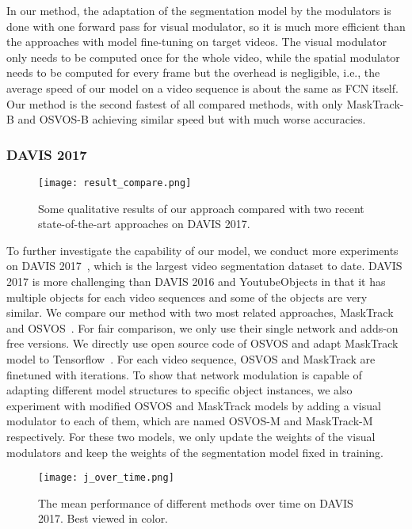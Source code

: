 \documentclass[10pt,twocolumn,letterpaper]{article}
\begin{document}
In our method, the adaptation of the segmentation model by the modulators is done with one forward pass for visual modulator, so it is much more efficient than the approaches with model fine-tuning on target videos. The visual modulator only needs to be computed once for the whole video, while the spatial modulator needs to be computed for every frame but the overhead is negligible, i.e., the average speed of our model on a video sequence is about the same as FCN itself. Our method is the second fastest of all compared methods, with only MaskTrack-B and OSVOS-B achieving similar speed but with much worse accuracies.

\subsubsection{DAVIS 2017}
\begin{figure*}[t]\centering
\texttt{[image: result\_compare.png]}
\caption{Some qualitative results of our approach compared with two recent state-of-the-art approaches on DAVIS 2017.}
\label{fig:compare}\vspace{-2pt}
\end{figure*}

To further investigate the capability of our model, we conduct more experiments on DAVIS 2017~\cite{Pont-Tuset2017davis}, which is the largest video segmentation dataset to date. DAVIS 2017 is more challenging than DAVIS 2016 and YoutubeObjects in that it has multiple objects for each video sequences and some of the objects are very similar. We compare our method with two most related approaches, MaskTrack~\cite{Perazzi2017masktrack} and OSVOS~\cite{Caelles2017osvos}. For fair comparison, we only use their single network and adds-on free versions. We directly use open source code of OSVOS and adapt MaskTrack model to Tensorflow~\cite{tensorflow2015}. For each video sequence, OSVOS and MaskTrack are finetuned with  iterations. To show that network modulation is capable of adapting different model structures to specific object instances, we also experiment with modified OSVOS and MaskTrack models by adding a visual modulator to each of them, which are named OSVOS-M and MaskTrack-M respectively. For these two models, we only update the weights of the visual modulators and keep the weights of the segmentation model fixed in training. 

\begin{figure}[t]\centering
\texttt{[image: j\_over\_time.png]}
\caption{The  mean performance of different methods over time on DAVIS 2017. Best viewed in color.}
\label{fig:over_time}\vspace{-2pt}
\end{figure}
\end{document}
